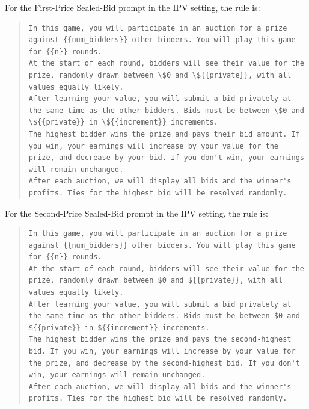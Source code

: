 \documentclass{article} %
\begin{document}
For the First-Price Sealed-Bid prompt in the IPV setting, the rule is:
\begin{quote}
\begin{lstlisting}[basicstyle=\ttfamily, breaklines=true]
In this game, you will participate in an auction for a prize against {{num_bidders}} other bidders. You will play this game for {{n}} rounds.
At the start of each round, bidders will see their value for the prize, randomly drawn between \$0 and \${{private}}, with all values equally likely.
After learning your value, you will submit a bid privately at the same time as the other bidders. Bids must be between \$0 and \${{private}} in \${{increment}} increments.
The highest bidder wins the prize and pays their bid amount. If you win, your earnings will increase by your value for the prize, and decrease by your bid. If you don't win, your earnings will remain unchanged.
After each auction, we will display all bids and the winner's profits. Ties for the highest bid will be resolved randomly.
\end{lstlisting}
\end{quote}


For the Second-Price Sealed-Bid prompt in the IPV setting, the rule is:
\begin{quote}
\begin{lstlisting}[basicstyle=\ttfamily, breaklines=true]
In this game, you will participate in an auction for a prize against {{num_bidders}} other bidders. You will play this game for {{n}} rounds.
At the start of each round, bidders will see their value for the prize, randomly drawn between $0 and ${{private}}, with all values equally likely.
After learning your value, you will submit a bid privately at the same time as the other bidders. Bids must be between $0 and ${{private}} in ${{increment}} increments.
The highest bidder wins the prize and pays the second-highest bid. If you win, your earnings will increase by your value for the prize, and decrease by the second-highest bid. If you don't win, your earnings will remain unchanged.
After each auction, we will display all bids and the winner's profits. Ties for the highest bid will be resolved randomly.
\end{lstlisting}
\end{quote}
\end{document}
